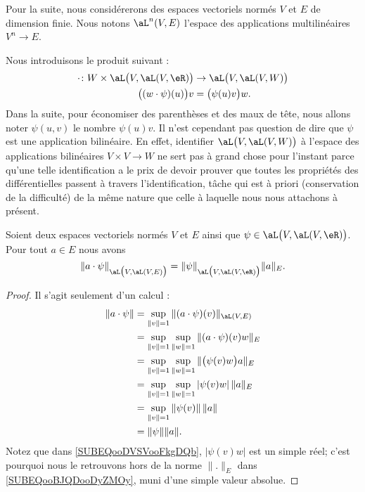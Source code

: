 Pour la suite, nous considérerons des espaces vectoriels normés \( V\) et \( E\) de dimension finie. Nous notons \( \aL^n(V,E)\) l'espace des applications multilinéaires \( V^n\to E\).

Nous introduisons le produit suivant\cite{MonCerveau} :
\begin{equation}
	\begin{aligned}
		\cdot\colon W\times \aL\big( V,\aL(V,\eR) \big) & \to \aL\big( V,\aL(V,W) \big) \\
		\big( (w\cdot \psi)(u) \big)v                   & =\big( \psi(u)v \big)w.
	\end{aligned}
\end{equation}
Dans la suite, pour économiser des parenthèses et des maux de tête, nous allons noter \( \psi(u,v)\) le nombre \( \psi(u)v\). Il n'est cependant pas question de dire que \( \psi\) est une application bilinéaire. En effet, identifier \( \aL\big( V,\aL(V,W) \big)\) à l'espace des applications bilinéaires \( V\times V\to W\) ne sert pas à grand chose pour l'instant parce qu'une telle identification a le prix de devoir prouver que toutes les propriétés des différentielles passent à travers l'identification, tâche qui est à priori (conservation de la difficulté) de la même nature que celle à laquelle nous nous attachons à présent.

\begin{lemma}        \label{LEMooHCUSooXYHuBR}
	Soient deux espaces vectoriels normés \( V\) et \( E\) ainsi que \( \psi\in\aL\big( V,\aL(V,\eR) \big)\). Pour tout \( a\in E\) nous avons
	\begin{equation}
		\| a\cdot \psi \|_{\aL\big( V,\aL(V,E) \big)}= \| \psi \|_{\aL\big( V,\aL(V,\eR) \big)}\| a \|_E.
	\end{equation}
\end{lemma}

\begin{proof}
	Il s'agit seulement d'un calcul :
	\begin{subequations}
		\begin{align}
			\| a\cdot \psi \| & =\sup_{\| v \|=1}\| (a\cdot \psi)(v) \|_{\aL(V,E)}                                          \\
			                  & =\sup_{\| v \|=1}\sup_{\| w \|=1}\| (a\cdot\psi)(v)w \|_E                                   \\
			                  & =\sup_{\| v \|=1}\sup_{\| w \|=1}\| \big( \psi(v)w \big)a \|_E  \label{SUBEQooDVSVooFkgDQb} \\
			                  & =\sup_{\| v \|=1}\sup_{\| w \|=1}| \psi(v)w |\,\| a \|_{E} \label{SUBEQooBJQDooDyZMOy}      \\
			                  & =\sup_{\| v \|=1}\| \psi(v) \|\,\| a \|                                                     \\
			                  & =\| \psi \|\| a \|.
		\end{align}
	\end{subequations}
	Notez que dans \eqref{SUBEQooDVSVooFkgDQb}, \( | \psi(v)w |\) est un simple réel; c'est pourquoi nous le retrouvons hors de la norme \( \| . \|_E\) dans \eqref{SUBEQooBJQDooDyZMOy}, muni d'une simple valeur absolue.
\end{proof}

